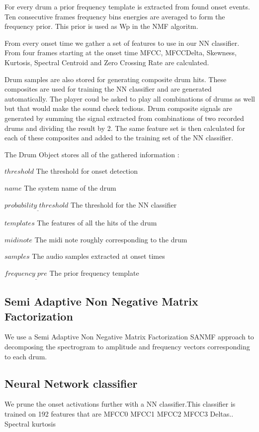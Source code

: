 \documentclass[10pt]{article}
\begin{document}
For every drum a prior frequency template is extracted from found onset events. Ten consecutive frames frequency bins energies are averaged to form the frequency prior. This prior is used as Wp in the NMF algoritm.

From every onset time we gather a set of features to use in our NN classifier. From four frames starting at the onset time MFCC, MFCCDelta, Skewness, Kurtosis, Spectral Centroid and Zero Crossing Rate are calculated. 

Drum samples are also stored for generating composite drum hits. These composites are used for training the NN classifier and are generated automatically. The player coud be asked to play all combinations of drums as well but that would make the sound check tedious.
Drum composite signals are generated by summing the signal extracted from combinations of two recorded drums and dividing the result by 2. The same feature set is then calculated for each of these composites and added to the training set of the NN classifier.


The Drum Object stores all of the gathered information :
\begin{center}

\item[$threshold$] The threshold for onset detection
\item[$name$] The system name of the drum
\item[$probability_\_threshold$] The threshold for the NN classifier
\item[$templates$] The features of all the hits of the drum
\item[$midinote$] The midi note roughly corresponding to the drum
\item[$samples$]The audio samples extracted at onset times
\item[$frequency_\_pre$]The prior frequency template

\end{center}

\subsection{Semi Adaptive Non Negative Matrix Factorization}
We use a Semi Adaptive Non Negative Matrix Factorization SANMF approach to decomposing the spectrogram to amplitude and frequency vectors corresponding to each drum.

\subsection{Neural Network classifier}
We prune the onset activations further with a NN classifier.This classifier is trained on 192 features that are MFCC0 MFCC1 MFCC2 MFCC3 Deltas..
Spectral kurtosis
\end{document}
